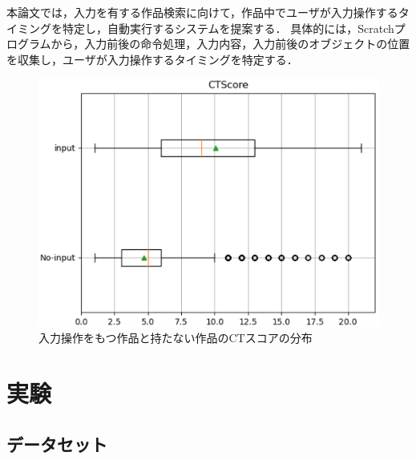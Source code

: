 \documentclass[uplatex,dvipdfmx,a4paper,twocolumn,base=11pt,jbase=11pt,ja=standard]{bxjsarticle}  %
\newcommand{\todo}[1]{\colorbox{yellow}{{\bf TODO}:}{\color{red} {\textbf{[#1]}}}}
\begin{document}

本論文では，入力を有する作品検索に向けて，作品中でユーザが入力操作するタイミングを特定し，自動実行するシステムを提案する．
具体的には，Scratchプログラムから，入力前後の命令処理，入力内容，入力前後のオブジェクトの位置を収集し，ユーザが入力操作するタイミングを特定する．

\begin{figure}
\begin{center}
\includegraphics[width=0.9\linewidth]{plot.eps}
\caption{入力操作をもつ作品と持たない作品のCTスコアの分布}
\label{fig:test}
\end{center}
\end{figure}



\section{実験}


\subsection{データセット}
\end{document}
